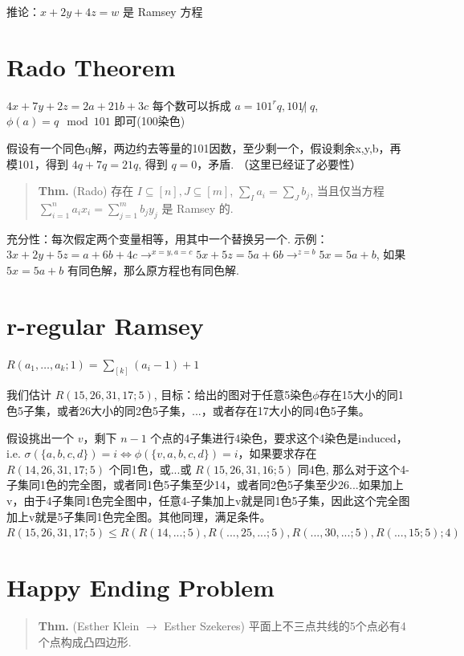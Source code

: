 推论：$x+2y+4z=w$ 是 Ramsey 方程


\section{Rado Theorem}

$4x+7y+2z=2a+21b+3c$ 每个数可以拆成 $a=101^rq,101\not|\;q$, $\phi(a)=q\mod 101$ 即可(100染色)

假设有一个同色q解，两边约去等量的101因数，至少剩一个，假设剩余x,y,b，再模101，得到 $4q+7q=21q$, 得到 $q=0$，矛盾. （这里已经证了必要性）

\begin{quotation}
\textbf{Thm.} (Rado) 存在 $I\subseteq[n],J\subseteq[m]$, $\sum_Ia_i=\sum_Jb_j$, 当且仅当方程 $\sum_{i=1}^n a_ix_i=\sum_{j=1}^m b_jy_j$ 是 Ramsey 的.
\end{quotation}

充分性：每次假定两个变量相等，用其中一个替换另一个. 示例：$3x+2y+5z=a+6b+4c\to^{x=y,a=c}5x+5z=5a+6b\to^{z=b}5x=5a+b$, 如果 $5x=5a+b$ 有同色解，那么原方程也有同色解.


\section{r-regular Ramsey}

$R(a_1,\dots,a_k;1)=\sum_{[k]}(a_i-1)+1$

我们估计 $R(15,26,31,17;5)$, 目标：给出的图对于任意5染色$\phi$存在15大小的同1色5子集，或者26大小的同2色5子集，...，或者存在17大小的同4色5子集。

假设挑出一个 $v$，剩下 $n-1$ 个点的4子集进行4染色，要求这个4染色是induced，i.e. $\sigma(\{a,b,c,d\})=i\iff\phi(\{v,a,b,c,d\})=i$，如果要求存在 $R(14,26,31,17;5)$ 个同1色，或...或 $R(15,26,31,16;5)$ 同4色, 那么对于这个4-子集同1色的完全图，或者同1色5子集至少14，或者同2色5子集至少26...如果加上v，由于4子集同1色完全图中，任意4-子集加上v就是同1色5子集，因此这个完全图加上v就是5子集同1色完全图。其他同理，满足条件。$R(15,26,31,17;5)\leq R(R(14,...;5),R(...,25,...;5),R(...,30,...;5),R(...,15;5);4)$

\section{Happy Ending Problem}

\begin{quotation}
\textbf{Thm.} (Esther Klein $\to$ Esther Szekeres) 平面上不三点共线的5个点必有4个点构成凸四边形.
\end{quotation}

